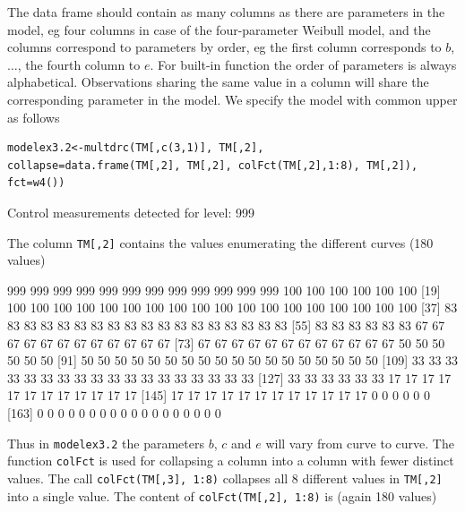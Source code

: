 \documentclass[a4paper]{article}
\begin{document}
The data frame should contain as many columns as there are parameters in the model, eg four columns in case of the four-parameter Weibull model, 
and the columns correspond to parameters by order, eg the first column
corresponds to $b$, $\ldots$, the fourth column to $e$. For built-in function the order of parameters is always alphabetical. 
Observations sharing the same value in a column will share the corresponding parameter in the model. We specify the model with common upper as follows

\begin{verbatim}
modelex3.2<-multdrc(TM[,c(3,1)], TM[,2],
collapse=data.frame(TM[,2], TM[,2], colFct(TM[,2],1:8), TM[,2]), fct=w4())
\end{verbatim}
\begin{Schunk}
\begin{Soutput}
Control measurements detected for level: 999
\end{Soutput}
\end{Schunk}

The column \verb+TM[,2]+ contains the values enumerating the different curves (180 values)

\begin{Schunk}
\begin{Soutput}
  [1] 999 999 999 999 999 999 999 999 999 999 999 999 100 100 100 100 100 100
 [19] 100 100 100 100 100 100 100 100 100 100 100 100 100 100 100 100 100 100
 [37]  83  83  83  83  83  83  83  83  83  83  83  83  83  83  83  83  83  83
 [55]  83  83  83  83  83  83  67  67  67  67  67  67  67  67  67  67  67  67
 [73]  67  67  67  67  67  67  67  67  67  67  67  67  50  50  50  50  50  50
 [91]  50  50  50  50  50  50  50  50  50  50  50  50  50  50  50  50  50  50
[109]  33  33  33  33  33  33  33  33  33  33  33  33  33  33  33  33  33  33
[127]  33  33  33  33  33  33  17  17  17  17  17  17  17  17  17  17  17  17
[145]  17  17  17  17  17  17  17  17  17  17  17  17   0   0   0   0   0   0
[163]   0   0   0   0   0   0   0   0   0   0   0   0   0   0   0   0   0   0
\end{Soutput}
\end{Schunk}
Thus in \verb+modelex3.2+ the parameters $b$, $c$ and $e$ will vary from curve to curve. The function \verb+colFct+ is used for
collapsing a column into a column with fewer distinct values. The call \verb+colFct(TM[,3], 1:8)+ collapses all 8 different values in \verb+TM[,2]+ into 
a single value. The content of \verb+colFct(TM[,2], 1:8)+ is (again 180 values)
\end{document}
